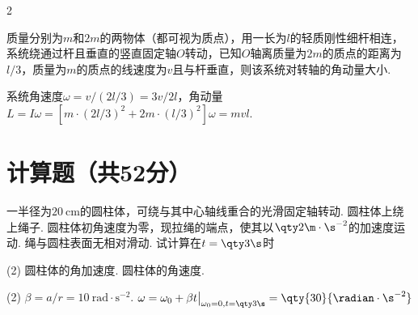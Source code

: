 \begin{paracol}{2}
    \begin{problem}
        质量分别为$m$和$2m$的两物体（都可视为质点），用一长为$l$的轻质刚性细杆相连，系统绕通过杆且垂直的竖直固定轴$O$转动，已知$O$轴离质量为$2m$的质点的距离为$l/3$，质量为$m$的质点的线速度为$v$且与杆垂直，则该系统对转轴的角动量大小.
        \switchcolumn\vspace*{\fill}\centering
        \vspace*{\fill}
    \end{problem}
\end{paracol}
\begin{solution}
    系统角速度$\displaystyle\omega=v/(2l/3)=3v/2l$，角动量$L=I\omega=[m\cdot(2l/3)^2+2m\cdot(l/3)^2]\omega=mvl$.
\end{solution}

\section{计算题（共52分）}

\begin{problem}
    一半径为$\qty{20}\cm$的圆柱体，可绕与其中心轴线重合的光滑固定轴转动. 圆柱体上绕上绳子. 圆柱体初角速度为零，现拉绳的端点，使其以$\qty2{\m\cdot\s^{-2}}$的加速度运动. 绳与圆柱表面无相对滑动. 试计算在$t=\qty3\s$时
    \begin{tasks}[label=\arabic*.](2)
        \task 圆柱体的角加速度.
        \task 圆柱体的角速度.
    \end{tasks}
\end{problem}
\begin{solution}\leavevmode
    \begin{tasks}[label=\arabic*.](2)
        \task $\beta=a/r=\qty{10}{\radian\cdot\s^{-2}}$.
        \task $\omega=\omega_0+\beta t\big|_{\omega_0=0,t=\qty3\s}=\qty{30}{\radian\cdot\s^{-2}}$
    \end{tasks}
\end{solution}

